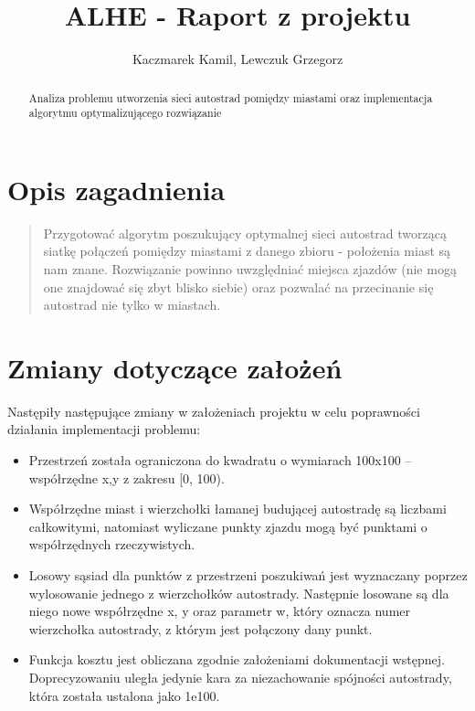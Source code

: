 \documentclass[a4paper]{article}
\title{ALHE - Raport z projektu}
\author{Kaczmarek Kamil, Lewczuk Grzegorz}
\begin{document}
\maketitle

\begin{abstract}
Analiza problemu utworzenia sieci autostrad pomiędzy miastami oraz implementacja algorytmu optymalizującego rozwiązanie
\end{abstract}

\section{Opis zagadnienia}

\begin{quote}
Przygotować algorytm poszukujący optymalnej sieci autostrad tworzącą siatkę połączeń pomiędzy miastami z danego zbioru - położenia miast są nam znane. Rozwiązanie powinno uwzględniać miejsca zjazdów (nie mogą one znajdować się zbyt blisko siebie) oraz pozwalać na przecinanie się autostrad nie tylko w miastach.
\end{quote}

\section{Zmiany dotyczące założeń}

Następiły następujące zmiany w założeniach projektu w celu poprawności działania implementacji problemu:

\begin{itemize}
\item Przestrzeń została ograniczona do kwadratu o wymiarach 100x100 – współrzędne x,y z zakresu [0, 100).
\item Współrzędne miast i wierzchołki łamanej budującej autostradę są liczbami całkowitymi, natomiast wyliczane punkty zjazdu mogą być punktami o współrzędnych rzeczywistych.
\item Losowy sąsiad dla punktów z przestrzeni poszukiwań jest wyznaczany poprzez wylosowanie jednego z wierzchołków autostrady. Następnie losowane są dla niego nowe współrzędne x, y oraz parametr w, który oznacza numer wierzchołka autostrady, z którym jest połączony dany punkt.
\item Funkcja kosztu jest obliczana zgodnie założeniami dokumentacji wstępnej. Doprecyzowaniu uległa jedynie kara za niezachowanie spójności autostrady, która została ustalona jako 1e100.
\end{itemize}
\end{document}

